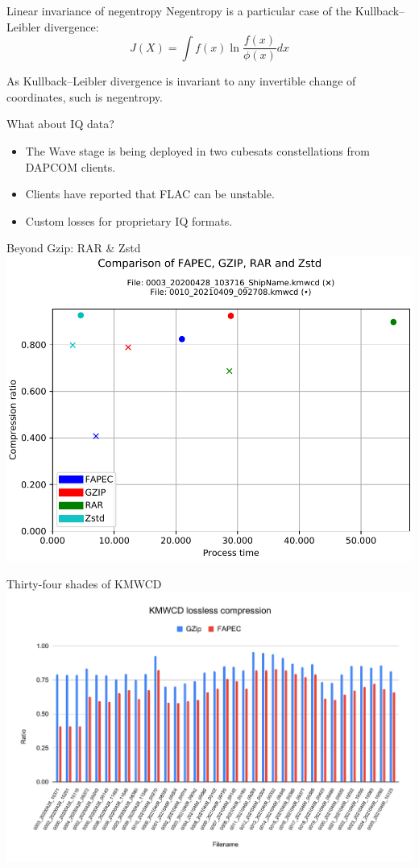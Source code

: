 \documentclass[usenames,dvipsnames]{beamer}
\begin{document}
\begin{frame}[noframenumbering]{Linear invariance of negentropy}
Negentropy is a particular case of the Kullback–Leibler divergence:
\[
J(X) = \int f(x) \ln \frac{f(x)}{\phi(x)} dx
\]

As Kullback–Leibler divergence is invariant to any invertible change of coordinates, such is negentropy.
\end{frame}

\begin{frame}[noframenumbering]{What about IQ data?}
\begin{itemize}
	\item The Wave stage is being deployed in two cubesats constellations from DAPCOM clients.
	\item Clients have reported that FLAC can be unstable.
	\item Custom losses for proprietary IQ formats.
\end{itemize}
\end{frame}

\begin{frame}[noframenumbering]{Beyond Gzip: RAR \& Zstd}
\centering
\includegraphics[scale=0.62]{graphics/files.csv_comparison.pdf}
\end{frame}

\begin{frame}[noframenumbering]{Thirty-four shades of KMWCD}
\centering
\includegraphics[scale=0.35]{graphics/KMWCD lossless compression.pdf}
\end{frame}
\end{document}
